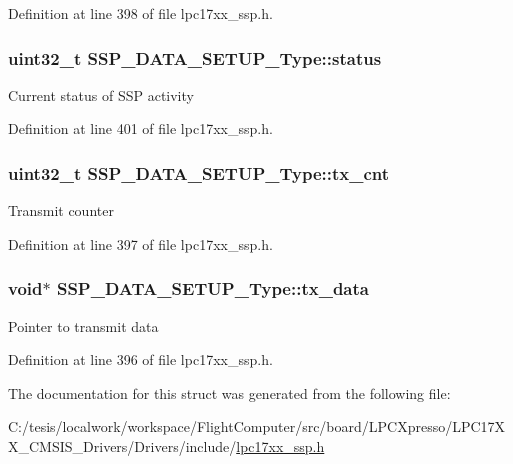 \-Definition at line 398 of file lpc17xx\-\_\-ssp.\-h.

\hypertarget{struct_s_s_p___d_a_t_a___s_e_t_u_p___type_abf9967b343e936a1e2cbdefbe9f53cea}{
\subsubsection[{status}]{\setlength{\rightskip}{0pt plus 5cm}uint32\-\_\-t {\bf \-S\-S\-P\-\_\-\-D\-A\-T\-A\-\_\-\-S\-E\-T\-U\-P\-\_\-\-Type\-::status}}}\label{struct_s_s_p___d_a_t_a___s_e_t_u_p___type_abf9967b343e936a1e2cbdefbe9f53cea}
\-Current status of \-S\-S\-P activity 

\-Definition at line 401 of file lpc17xx\-\_\-ssp.\-h.

\hypertarget{struct_s_s_p___d_a_t_a___s_e_t_u_p___type_a857e70ea892f6e800fcfc7d971bb1daf}{
\subsubsection[{tx\-\_\-cnt}]{\setlength{\rightskip}{0pt plus 5cm}uint32\-\_\-t {\bf \-S\-S\-P\-\_\-\-D\-A\-T\-A\-\_\-\-S\-E\-T\-U\-P\-\_\-\-Type\-::tx\-\_\-cnt}}}\label{struct_s_s_p___d_a_t_a___s_e_t_u_p___type_a857e70ea892f6e800fcfc7d971bb1daf}
\-Transmit counter 

\-Definition at line 397 of file lpc17xx\-\_\-ssp.\-h.

\hypertarget{struct_s_s_p___d_a_t_a___s_e_t_u_p___type_a3ce86564e96199f4bed5d67e13016a74}{
\subsubsection[{tx\-\_\-data}]{\setlength{\rightskip}{0pt plus 5cm}void$\ast$ {\bf \-S\-S\-P\-\_\-\-D\-A\-T\-A\-\_\-\-S\-E\-T\-U\-P\-\_\-\-Type\-::tx\-\_\-data}}}\label{struct_s_s_p___d_a_t_a___s_e_t_u_p___type_a3ce86564e96199f4bed5d67e13016a74}
\-Pointer to transmit data 

\-Definition at line 396 of file lpc17xx\-\_\-ssp.\-h.



\-The documentation for this struct was generated from the following file\-:\begin{DoxyCompactItemize}
\item 
\-C\-:/tesis/localwork/workspace/\-Flight\-Computer/src/board/\-L\-P\-C\-Xpresso/\-L\-P\-C17\-X\-X\-\_\-\-C\-M\-S\-I\-S\-\_\-\-Drivers/\-Drivers/include/\hyperlink{lpc17xx__ssp_8h}{lpc17xx\-\_\-ssp.\-h}\end{DoxyCompactItemize}
